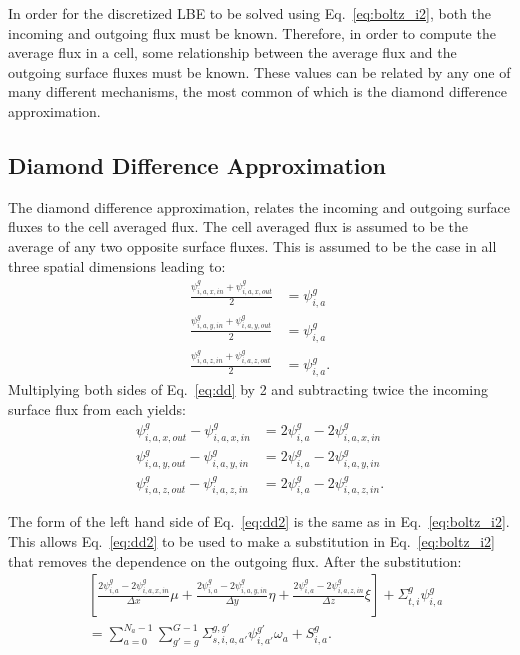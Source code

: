 In order for the discretized LBE to be solved using Eq.~\ref{eq:boltz_i2}, both the incoming and outgoing flux must be known. Therefore, in order to compute the average flux in a cell, some relationship between the average flux and the outgoing surface fluxes must be known. These values can be related by any one of many different mechanisms, the most common of which is the diamond difference approximation.

\subsection{Diamond Difference Approximation}

The diamond difference approximation, relates the incoming and outgoing surface fluxes to the cell averaged flux. The cell averaged flux is assumed to be the average of any two opposite surface fluxes. This is assumed to be the case in all three spatial dimensions leading to:
\begin{equation} \label{eq:dd}
\begin{split}
\frac{\psi_{i,a,x,in}^g + \psi_{i,a,x,out}^g}{2} &= \psi_{i,a}^{g} \\
\frac{\psi_{i,a,y,in}^g + \psi_{i,a,y,out}^g}{2} &= \psi_{i,a}^{g} \\
\frac{\psi_{i,a,z,in}^g + \psi_{i,a,z,out}^g}{2} &= \psi_{i,a}^{g}.
\end{split}
\end{equation}
Multiplying both sides of Eq.~\ref{eq:dd} by 2 and subtracting twice the incoming surface flux from each yields:
\begin{equation} \label{eq:dd2}
\begin{split}
\psi_{i,a,x,out}^g - \psi_{i,a,x,in}^g &= 2\psi_{i,a}^{g} - 2\psi_{i,a,x,in}^g \\
\psi_{i,a,y,out}^g - \psi_{i,a,y,in}^g &= 2\psi_{i,a}^{g} - 2\psi_{i,a,y,in}^g \\
\psi_{i,a,z,out}^g - \psi_{i,a,z,in}^g &= 2\psi_{i,a}^{g} - 2\psi_{i,a,z,in}^g.
\end{split}
\end{equation}

The form of the left hand side of Eq.~\ref{eq:dd2} is the same as in Eq.~\ref{eq:boltz_i2}. This allows Eq.~\ref{eq:dd2} to be used to make a substitution in Eq.~\ref{eq:boltz_i2} that removes the dependence on the outgoing flux. After the substitution:
\begin{equation} \label{eq:boltz_i3}
\begin{split}
&\left[ 
\frac{2\psi_{i,a}^{g} - 2\psi_{i,a,x,in}^g}{\Delta x} \mu + 
\frac{2\psi_{i,a}^{g} - 2\psi_{i,a,y,in}^g}{\Delta y} \eta + 
\frac{2\psi_{i,a}^{g} - 2\psi_{i,a,z,in}^g}{\Delta z} \xi
\right]
+ \Sigma_{t,i}^g \psi_{i,a}^{g} \\
& = 
\sum_{a=0}^{N_a-1} \sum_{g'=g}^{G-1} \Sigma_{s, i, a, a'}^{g, g'} \psi_{i, a'}^{g'} \omega_a + S_{i,a}^g.
\end{split}
\end{equation}

